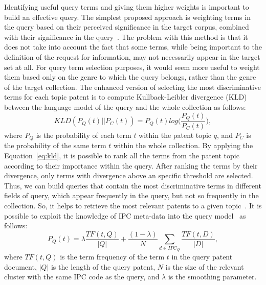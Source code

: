 Identifying useful query terms and giving them higher weights is important to build an effective query. The simplest proposed approach is weighting terms in the query based on their perceived significance in the target corpus, combined with their significance in the query~\citep{itoh2003term}. The problem with this method is that it does not take into account the fact that some terms, while being important to the definition of the request for information, may not necessarily appear in the target set at all. For query term selection purposes, it would seem more useful to weight them based only on the genre to which the query belongs, rather than the genre of the target collection. The enhanced version of selecting the most discriminative terms for each topic patent is to compute Kullback-Leibler divergence (KLD)~\citep{kullback1951information} between the language model of the query and the whole collection as follows:
\begin{equation}
\label{eq:kld}
 KLD(P_{Q}(t)||P_{C}(t)) = P_{Q}(t)log\Big(\frac{P_{Q}(t)}{P_{C}(t)}\Big),  
\end{equation}
where $ P_{Q} $ is the probability of each term $ t $ within the patent topic $ q $, and $ P_{C} $ is the probability of the same term $ t $ within the whole collection. 
By applying the Equation~\ref{eq:kld}, it is possible to rank all the terms from the patent topic according to their importance within the query. After ranking the terms by their divergence, only terms with divergence above an specific threshold are selected. Thus, we can build queries that contain the most discriminative terms in different fields of query, which appear frequently in the query, but not so frequently in the collection. So, it helps to retrieve the most relevant patents to a given topic~\citep{perez2010using}. It is possible to exploit the knowledge of IPC meta-data into the query model~\citep{mahdabi2011building} as follows:
\begin{equation}
\label{eq:IPCmodel}
 P_{Q}(t) = \lambda\frac{TF(t,Q)}{|Q|}+\frac{(1-\lambda)}{N}\sum_{d\in IPC_{Q}}\frac{TF(t,D)}{|D|} , 
\end{equation}
where $ TF(t,Q) $ is the term frequency of the term $ t $ in the query patent document, $ |Q| $ is the length of the query patent, $ N $ is the size of the relevant cluster with the same IPC code as the query, and $ \lambda $ is the smoothing parameter.
